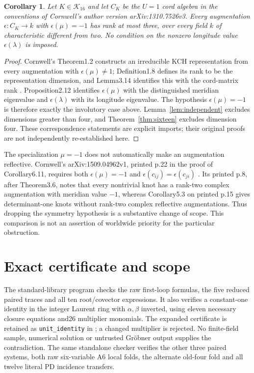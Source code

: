 \documentclass[11pt]{article}
\newtheorem{corollary}[lemma]{Corollary}
\begin{document}
\begin{corollary}\label{cor:augmentation}
Let $K\in\mathcal K_{16}$ and let $C_K$ be the $U=1$ cord algebra in
the conventions of Cornwell's author version arXiv:1310.7526v3.
Every augmentation $\epsilon:C_K\to k$ with $\epsilon(\mu)=-1$ has rank
at most three, over every field $k$ of characteristic different
from two. No condition on the nonzero longitude value
$\epsilon(\lambda)$ is imposed.
\end{corollary}
\begin{proof}
Cornwell's Theorem1.2 constructs an irreducible KCH representation
from every augmentation with $\epsilon(\mu)\ne1$; Definition1.8
defines its rank to be the representation dimension, and Lemma3.14
identifies this with the cord-matrix rank \cite{cor17}.
Proposition2.12 identifies $\epsilon(\mu)$ with the distinguished
meridian eigenvalue and $\epsilon(\lambda)$ with its longitude
eigenvalue. The hypothesis $\epsilon(\mu)=-1$ is therefore exactly
the involutory case above. Lemma~\ref{lem:independent} excludes
dimensions greater than four, and Theorem~\ref{thm:sixteen} excludes
dimension four. These correspondence statements are explicit imports;
their original proofs are not independently re-established here.
\end{proof}

The specialization $\mu=-1$ does not automatically make an augmentation
reflective. Cornwell's arXiv:1509.04962v1, printed p.22 in the proof
of Corollary6.11, requires both $\epsilon(\mu)=-1$ and
$\epsilon(c_{ij})=\epsilon(c_{ji})$ \cite{cor15}.
Its printed p.8, after Theorem3.6, notes that every nontrivial knot
has a rank-two complex augmentation with meridian value $-1$, whereas
Corollary5.3 on printed p.15 gives determinant-one knots without
rank-two complex reflective augmentations. Thus dropping the symmetry
hypothesis is a substantive change of scope. This comparison is not
an assertion of worldwide priority for the particular obstruction.

\section{Exact certificate and scope}

The standard-library program 
checks the raw first-loop formulas, the five reduced paired traces
and all ten root/covector expressions. It also verifies a constant-one
identity in the integer Laurent ring with $\alpha,\beta$ inverted,
using eleven necessary closure equations and26 multiplier monomials.
The expanded certificate is retained as \texttt{unit\_identity} in
;
a changed multiplier is rejected. No finite-field sample, numerical
solution or untrusted Gr\"obner output supplies the contradiction.
The same standalone checker verifies the other
three paired systems, both raw six-variable A6 local folds, the
alternate old-four fold and all twelve literal PD incidence transfers.
\end{document}
